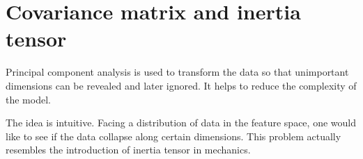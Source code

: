 \section{Covariance matrix and inertia tensor}
Principal component analysis is used to transform the data so that unimportant dimensions can be revealed and later ignored. It helps to reduce the complexity of the model.

The idea is intuitive. Facing a distribution of data in the feature space, one would like to see if the data collapse along certain dimensions. This problem actually resembles the introduction of inertia tensor in mechanics.
